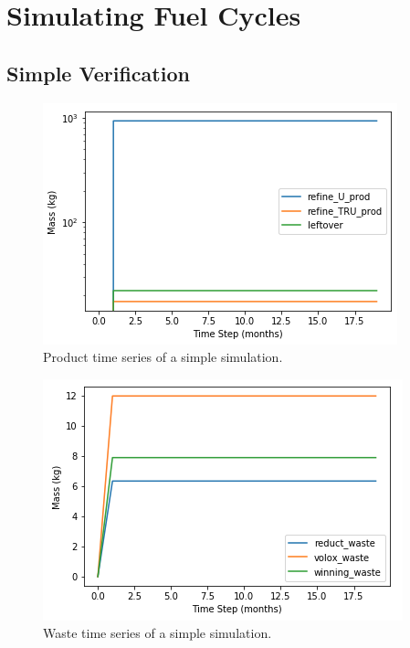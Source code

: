 \chapter[Simulating Fuel Cycles]{Simulating Fuel Cycles}
\section{Simple Verification}

\begin{figure}
	\centering
	\includegraphics[width=\linewidth]{images/timeseries-prod}
	\caption{Product time series of a simple simulation.}
	\label{fig:timeseries-prod}
\end{figure}

\begin{figure}
	\centering
	\includegraphics[width=\linewidth]{images/timeseries-waste}
	\caption{Waste time series of a simple simulation.}
	\label{fig:timeseries-waste}
\end{figure}


